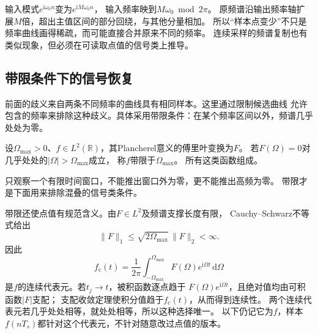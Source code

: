 输入模式$e^{\mathrm i\omega_0n}$变为$e^{\mathrm iM\omega_0n}$，
输入频率映到$M\omega_0\bmod2\pi$。
原频谱沿输出频率轴扩展$M$倍，超出主值区间的部分回绕，与其他分量相加。
所以“样本点变少”不只是频率曲线画得稀疏，而可能直接合并原来不同的频率。
连续采样的频谱复制也有类似现象，但必须在可读取点值的信号类上推导。

\subsection{带限条件下的信号恢复}
\label{sec:signal-bandlimited-recovery}

前面的歧义来自两条不同频率的曲线具有相同样本。这里通过限制候选曲线
允许包含的频率来排除这种歧义。具体采用带限条件：在某个频率区间以外，频谱几乎处处为零。
\begin{definition}[平方可积带限信号]
  \label{def:signal-analysis-bandlimited-space}
  设$\Omega_{\max}>0$、$f\in L^2(\mathbb R)$，其Plancherel意义的傅里叶变换为$F$。
  若$F(\Omega)=0$对几乎处处的$|\Omega|>\Omega_{\max}$成立，
  称$f$带限于$\Omega_{\max}$。
  所有这类函数组成。
\end{definition}
只观察一个有限时间窗口，不能推出窗口外为零，更不能推出高频为零。
带限才是下面用来排除混叠的信号类条件。

带限还使点值有规范含义。由$F\in L^2$及频谱支撑长度有限，
Cauchy--Schwarz不等式给出
\[
  \|F\|_1\leq\sqrt{2\Omega_{\max}}\,\|F\|_2<\infty.
\]
因此
\[
  f_{\mathrm c}(t)=\frac1{2\pi}\int_{-\Omega_{\max}}^{\Omega_{\max}}
  F(\Omega)e^{\mathrm i\Omega t}\,\mathrm d\Omega
\]
是$f$的连续代表元。若$t_j\to t$，被积函数逐点趋于
$F(\Omega)e^{\mathrm i\Omega t}$，且绝对值均由可积函数$|F|$支配；
支配收敛定理使积分值趋于$f_{\mathrm c}(t)$，从而得到连续性。
两个连续代表元若几乎处处相等，就处处相等，所以这种选择唯一。
以下仍记它为$f$，样本$f(nT_s)$都针对这个代表元，不针对随意改过点值的版本。

